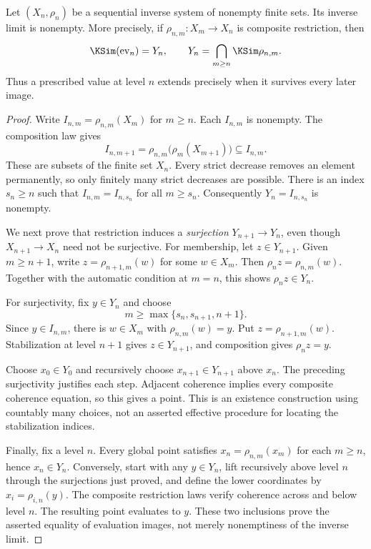 \begin{KSproposition}\label{KS:KS58}
Let \((X_n,\rho_n)\) be a sequential inverse system of nonempty finite sets. Its inverse limit is nonempty. More precisely, if \(\rho_{n,m}:X_m\to X_n\) is composite restriction, then
\[
 \KSim(\operatorname{ev}_n)=Y_n,
 \qquad Y_n=\bigcap_{m\ge n}\KSim\rho_{n,m}.
\]
Thus a prescribed value at level \(n\) extends precisely when it survives every later image.
\end{KSproposition}
\begin{proof}
Write \(I_{n,m}=\rho_{n,m}(X_m)\) for \(m\ge n\). Each \(I_{n,m}\) is nonempty. The composition law gives
\[
 I_{n,m+1}=\rho_{n,m}\bigl(\rho_m(X_{m+1})\bigr)\subseteq I_{n,m}.
\]
These are subsets of the finite set \(X_n\). Every strict decrease removes an element permanently, so only finitely many strict decreases are possible. There is an index \(s_n\ge n\) such that \(I_{n,m}=I_{n,s_n}\) for all \(m\ge s_n\). Consequently \(Y_n=I_{n,s_n}\) is nonempty.

We next prove that restriction induces a \emph{surjection} \(Y_{n+1}\to Y_n\), even though \(X_{n+1}\to X_n\) need not be surjective. For membership, let \(z\in Y_{n+1}\). Given \(m\ge n+1\), write \(z=\rho_{n+1,m}(w)\) for some \(w\in X_m\). Then \(\rho_n z=\rho_{n,m}(w)\). Together with the automatic condition at \(m=n\), this shows \(\rho_nz\in Y_n\).

For surjectivity, fix \(y\in Y_n\) and choose
\[
 m\ge\max\{s_n,s_{n+1},n+1\}.
\]
Since \(y\in I_{n,m}\), there is \(w\in X_m\) with \(\rho_{n,m}(w)=y\). Put \(z=\rho_{n+1,m}(w)\). Stabilization at level \(n+1\) gives \(z\in Y_{n+1}\), and composition gives \(\rho_nz=y\).

Choose \(x_0\in Y_0\) and recursively choose \(x_{n+1}\in Y_{n+1}\) above \(x_n\). The preceding surjectivity justifies each step. Adjacent coherence implies every composite coherence equation, so this gives a point. This is an existence construction using countably many choices, not an asserted effective procedure for locating the stabilization indices.

Finally, fix a level \(n\). Every global point satisfies \(x_n=\rho_{n,m}(x_m)\) for each \(m\ge n\), hence \(x_n\in Y_n\). Conversely, start with any \(y\in Y_n\), lift recursively above level \(n\) through the surjections just proved, and define the lower coordinates by \(x_i=\rho_{i,n}(y)\). The composite restriction laws verify coherence across and below level \(n\). The resulting point evaluates to \(y\). These two inclusions prove the asserted equality of evaluation images, not merely nonemptiness of the inverse limit.
\end{proof}
